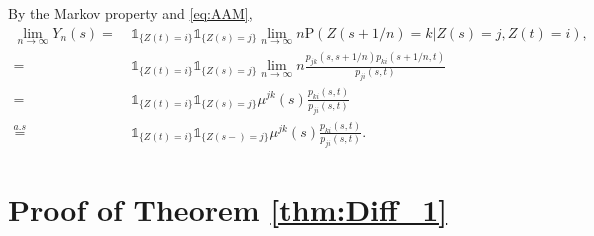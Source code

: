 \documentclass[12pt]{article}
\newcommand{\indic}[1]{\mathds{1}_{ \{ #1 \} }}
\renewcommand{\P}{\text{P}}
\theoremstyle{my_thm}
\theoremstyle{my_rem}
\begin{document}
By the Markov property and \eqref{eq:AAM},
\begin{align*}
\lim_{n\rightarrow \infty} Y_n(s) = \ & \indic{Z(t)=i} \indic{Z(s)=j} \lim_{n\rightarrow \infty} n \P \left. \left( Z(s+1/n)=k \right| Z(s)=j, Z(t)=i \right),
\\
= \ &\indic{Z(t)=i} \indic{Z(s)=j} \lim_{n\rightarrow \infty} n \frac{p_{jk}(s,s+1/n)p_{ki}(s+1/n,t)}{p_{ji}(s,t)}
\\
= \ &\indic{Z(t)=i} \indic{Z(s)=j} \mu^{jk}(s) \frac{p_{ki}(s,t)}{p_{ji}(s,t)}
\\
\overset{a.s}{=}
&\indic{Z(t)=i} \indic{Z(s-)=j} \mu^{jk}(s) \frac{p_{ki}(s,t)}{p_{ji}(s,t)}.
\end{align*}




\section{Proof of Theorem \ref{thm:Diff_1} }
\end{document}
